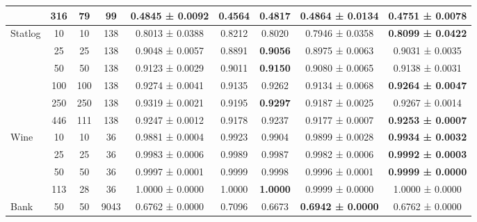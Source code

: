 \begin{table}
{\begin{tabular}[H]{@{}lcccccccc@{}}
                              & 316   & 79   & 99   & 0.4845 ± 0.0092      & 0.4564               & 0.4817          & \textbf{0.4864 ± 0.0134} & 0.4751 ± 0.0078          \\
                              \midrule
\multirow{6}{*}{Statlog}      & 10    & 10   & 138  & 0.8013 ± 0.0388      & 0.8212               & 0.8020          & 0.7946 ± 0.0358          & \textbf{0.8099 ± 0.0422} \\
                              & 25    & 25   & 138  & 0.9048 ± 0.0057      & 0.8891               & \textbf{0.9056} & 0.8975 ± 0.0063          & 0.9031 ± 0.0035          \\
                              & 50    & 50   & 138  & 0.9123 ± 0.0029      & 0.9011               & \textbf{0.9150} & 0.9080 ± 0.0065          & 0.9138 ± 0.0031          \\
                              & 100   & 100  & 138  & 0.9274 ± 0.0041      & 0.9135               & 0.9262          & 0.9134 ± 0.0068          & \textbf{0.9264 ± 0.0047} \\
                              & 250   & 250  & 138  & 0.9319 ± 0.0021      & 0.9195               & \textbf{0.9297} & 0.9187 ± 0.0025          & 0.9267 ± 0.0014          \\
                              & 446   & 111  & 138  & 0.9247 ± 0.0012      & 0.9178               & 0.9237          & 0.9177 ± 0.0007          & \textbf{0.9253 ± 0.0007} \\
                              \midrule
\multirow{4}{*}{Wine}         & 10    & 10   & 36   & 0.9881 ± 0.0004      & 0.9923               & 0.9904          & 0.9899 ± 0.0028          & \textbf{0.9934 ± 0.0032} \\
                              & 25    & 25   & 36   & 0.9983 ± 0.0006      & 0.9989               & 0.9987          & 0.9982 ± 0.0006          & \textbf{0.9992 ± 0.0003} \\
                              & 50    & 50   & 36   & 0.9997 ± 0.0001      & 0.9999               & 0.9998          & 0.9996 ± 0.0001          & \textbf{0.9999 ± 0.0000} \\
                              & 113   & 28   & 36   & 1.0000 ± 0.0000      & 1.0000               & \textbf{1.0000} & 0.9999 ± 0.0000          & 1.0000 ± 0.0000          \\
                              \midrule
\multirow{5}{*}{Bank}         & 50    & 50   & 9043 & 0.6762 ± 0.0000      & 0.7096               & 0.6673          & \textbf{0.6942 ± 0.0000} & 0.6762 ± 0.0000          \\

\end{tabular}}
\end{table}
